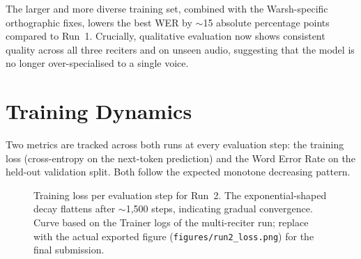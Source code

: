 The larger and more diverse training set, combined with the
Warsh-specific orthographic fixes, lowers the best WER by $\sim$15
absolute percentage points compared to Run~1. Crucially, qualitative
evaluation now shows consistent quality across all three reciters and on
unseen audio, suggesting that the model is no longer over-specialised
to a single voice.

\section{Training Dynamics}

Two metrics are tracked across both runs at every evaluation step:
the training loss (cross-entropy on the next-token prediction) and the
Word Error Rate on the held-out validation split. Both follow the
expected monotone decreasing pattern.

\begin{figure}[H]
  \centering
  \caption[Training loss curve (Run 2)]{Training loss per evaluation
  step for Run~2. The exponential-shaped decay flattens after
  $\sim$1{,}500 steps, indicating gradual convergence. Curve based on
  the Trainer logs of the multi-reciter run; replace with the actual
  exported figure (\texttt{figures/run2\_loss.png}) for the final
  submission.}
  \label{fig:mt_run2_loss}
\end{figure}

